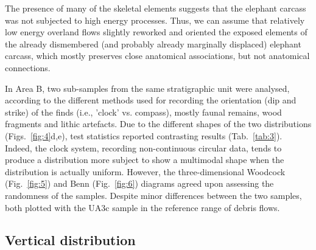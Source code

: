 \documentclass[preprint,authoryear,times]{elsarticle} %
\begin{document}
The presence of many of the skeletal elements suggests that the elephant carcass was not subjected to high energy processes. Thus, we can assume that relatively low energy overland flows slightly reworked and oriented the exposed elements of the already dismembered (and probably already marginally displaced) elephant carcass, which mostly preserves close anatomical associations, but not anatomical connections.


In Area B, two sub-samples from the same stratigraphic unit were analysed, according to the different methods used for recording the orientation (dip and strike) of the finds (i.e., 'clock' vs. compass), mostly faunal remains, wood fragments and lithic artefacts. Due to the different shapes of the two distributions (Figs.~\ref{fig:4}d,e), test statistics reported contrasting results (Tab.~\ref{tab:3}). Indeed, the clock system, recording non-continuous circular data, tends to produce a distribution more subject to show a multimodal shape when the distribution is actually uniform. However, the three-dimensional Woodcock (Fig.~\ref{fig:5}) and Benn (Fig.~\ref{fig:6}) diagrams agreed upon assessing the randomness of the samples. Despite minor differences between the two samples, both plotted with the UA3c sample in the reference range of debris flows.

\subsection{Vertical distribution}


\end{document}
